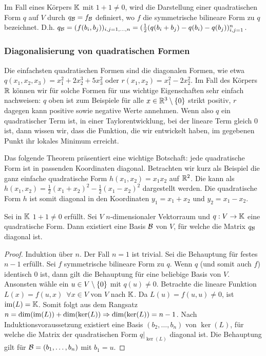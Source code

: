 Im Fall eines Körpers $ \mathbb K $ mit $ 1+1 \neq 0 $, wird die Darstellung einer quadratischen Form $ q $ auf $ V $ durch $ q_{\mathcal{B}} = f_{\mathcal{B}} $ definiert, wo $ f $ die symmetrische bilineare Form zu $ q $ bezeichnet. D.h. $ q_{\mathcal{B}} = (f(b_i,b_j))_{i,j=1,\ldots,n} = ( \frac{1}{2}(q(b_i+b_j) - q(b_i) - q(b_j) ){}_{i,j=1}^n $.

\subsubsection{Diagonalisierung von quadratischen Formen}

Die einfachsten quadratischen Formen sind die diagonalen Formen, wie etwa $q(x_1,x_2,x_3)= x_1^2 + 2 x_2^3 + 5 x_3^2$ oder $r(x_1,x_2)= x_1^2 - 2 x_2^2$. Im Fall des Körpers $\mathbb R$ können wir für solche Formen für uns wichtige Eigenschaften sehr einfach nachweisen: $q$ oben ist zum Beispiele für alle $x \in \mathbb R^3 \setminus \{0\}$ strikt positiv, $r$ dagegen kann positive sowie negative Werte annehmen. Wenn also $q$ ein quadratischer Term ist, in einer Taylorentwicklung, bei der lineare Term gleich $0$ ist, dann wissen wir, dass die Funktion, die wir entwickelt haben, im gegebenen Punkt ihr lokales Minimum erreicht. 

Das folgende Theorem präsentiert eine wichtige Botschaft: jede quadratische Form ist in passenden Koordinaten diagonal. Betrachten wir kurz als Beispiel die ganz einfache quadratische Form $h(x_1,x_2) = x_1 x_2$ auf $\mathbb R^2$. Die kann als $h(x_1,x_2) = \frac{1}{2} (x_1 + x_2)^2 - \frac{1}{2} (x_1-x_2)^2$ dargestellt werden. Die quadratische Form $h$ ist somit diagonal in den Koordinaten $y_1 = x_1 + x_2$ und $y_2 = x_1 - x_2$. 

\begin{thm}
	Sei in $ \mathbb K $ $ 1+1 \neq 0 $ erfüllt. Sei $ V $ $ n $-dimensionaler Vektorraum und $ q : V \to \mathbb K $ eine quadratische Form. Dann existiert eine Basis $ \mathcal{B} $ von $ V $, für welche die Matrix $ q_{\mathcal{B}} $ diagonal ist.
\end{thm}
\begin{proof}
	Induktion über $ n $. Der Fall $ n = 1 $ ist trivial. Sei die Behauptung für festes $ n-1 $ erfüllt. Sei $ f $ symmetrische bilineare Form zu $ q $. Wenn $ q $ (und somit auch $ f $) identisch 0 ist, dann gilt die Behauptung für eine beliebige Basis von $ V $. Ansonsten wähle ein $ u \in V \setminus \left\{ 0 \right\} $ mit $ q(u) \neq 0 $. Betrachte die lineare Funktion $ L(x) = f(u,x) \enspace \forall x \in V $ von $ V $ nach $ \mathbb K $. Da $ L(u) = f(u,u) \neq 0 $, ist $ \operatorname{im}(L) = \mathbb K $. Somit folgt aus dem Rangsatz $ n = \dim(\operatorname{im}(L)) + \dim(\ker(L)) \Rightarrow \dim(\ker(L)) = n-1 $. Nach Induktionsvoraussetzung existiert eine Basis $ (b_2, \ldots, b_n) $ von $ \ker(L) $, für welche die Matrix der quadratischen Form $ q|_{\ker(L)} $ diagonal ist. Die Behauptung gilt für $ \mathcal{B} = (b_1, \ldots, b_n) $ mit $ b_1 = u $.
\end{proof}

